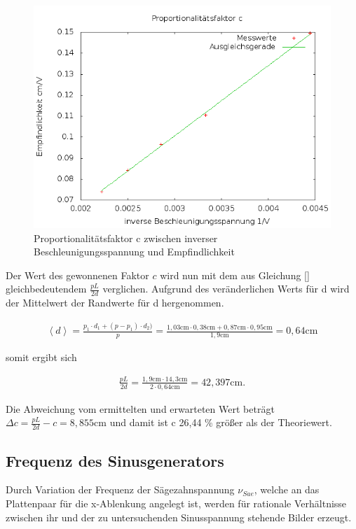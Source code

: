 \begin{figure}[H]
\includegraphics[width=1\textwidth] {pics/proportional.png}
\centering
\caption{Proportionalitätsfaktor c zwischen inverser Beschleunigungsspannung und Empfindlichkeit}
\end{figure}

Der Wert des gewonnenen Faktor $c$ wird nun mit dem aus Gleichung \eqref{} gleichbedeutendem $\frac{pL}{2d}$ verglichen.
Aufgrund des veränderlichen Werts für d wird der Mittelwert der Randwerte für d hergenommen.

\begin{align}
 \left< d \right> = \frac{p_1 \cdot d_1 + (p-p_1) \cdot d_2)}{p} = \frac{1,03\text{cm} \cdot 0,38\text{cm} + 0,87\text{cm} \cdot 0,95\text{cm}}{1,9\text{cm}} = 0,64 \text{cm}
\end{align}

somit ergibt sich

\begin{align}
 \frac{pL}{2d} = \frac{1,9\text{cm} \cdot 14,3\text{cm}}{2 \cdot 0,64\text{cm}} = 42,397 \text{cm}.
\end{align}

Die Abweichung vom ermittelten und erwarteten Wert beträgt $\Delta c = \frac{pL}{2d} - c = 8,855 \text{cm}$ und damit ist
c 26,44 \% größer als der Theoriewert.

\subsection{Frequenz des Sinusgenerators}
Durch Variation der Frequenz der Sägezahnspannung $\nu_{Sae}$, welche an das Plattenpaar für die x-Ablenkung angelegt ist,
werden für rationale Verhältnisse zwischen ihr und der zu untersuchenden Sinusspannung stehende Bilder erzeugt.


